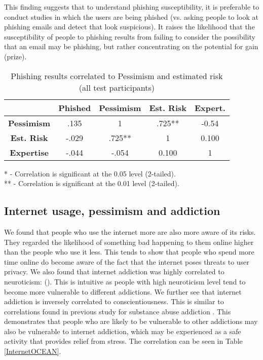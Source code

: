 \documentclass{sig-alternate}
\begin{document}
This finding suggests that to understand phishing susceptibility, it is preferable to conduct studies in which the users are being phished (vs. asking people to look at phishing emails and detect that look suspicious). It raises the likelihood that the susceptibility of people to phishing results from failing to consider the possibility that an email may be phishing, but rather concentrating on the potential for gain (prize). 

\begin{table}[htbp]
\begin{center}
\begin{tabular}{|c|c|c|c|c|}
\hline
&  \textbf{Phished} & \textbf{Pessimism}  &  \textbf{Est. Risk} & \textbf{Expert.}\\
\hline
\hline
\textbf{Pessimism}  & .135	& 1	& .725** & -0.54\\
\hline
\textbf{Est. Risk} & -.029 &	.725**	 &1 & 0.100\\
\hline
\textbf{Expertise} & -.044 &	-.054	 &0.100 & 1\\
\hline

\end{tabular}

\vspace{5mm}
* - Correlation is significant at the 0.05 level (2-tailed).\\
** - Correlation is significant at the 0.01 level (2-tailed).\\

\caption{Phishing results correlated to Pessimism and estimated risk (all test participants)}
\label{Phishedpessimism}
\end{center}
\end{table}





\subsection{Internet usage, pessimism and addiction}
We found that people who use the internet more are also more aware of its risks. They regarded the likelihood of something bad happening to them online higher than the people who use it less. This tends to show that people who spend more time online do become aware of the fact that the internet poses threats to user privacy.
We also found that internet addiction was highly correlated to neuroticism: (). 
This is intuitive as people with high neuroticism level tend to become more vulnerable to different addictions. 
We further see that internet addiction is inversely correlated to conscientiousness. This is similar to correlations found in previous study for substance abuse addiction \cite{KN07}.
This demonstrates that people who are likely to be vulnerable to other addictions may also be vulnerable to internet addiction, which may be experienced as a safe activity that provides relief from stress. The correlation can be seen in Table \ref{InternetOCEAN}.
\end{document}
